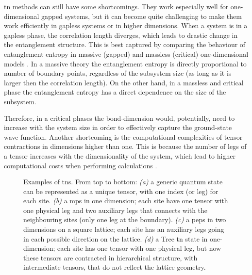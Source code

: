 \Ac{tn} methods can still have some shortcomings.
They work especially well for one-dimensional gapped systems, but it can become quite challenging to make them work efficiently in gapless systems or in higher dimensions.
When a system is in a gapless phase, the correlation length diverges, which leads to drastic change in the entanglement structure.
This is best captured by comparing the behaviour of entanglement entropy in massive (gapped) and massless (critical) one-dimensional models \cite{calabrese2004qft, calabrese2009cft}.
In a massive theory the entanglement entropy is directly proportional to number of boundary points, regardless of the subsystem size (as long as it is larger then the correlation length).
On the other hand, in a massless and critical phase the entanglement entropy has a direct dependence on the size of the subsystem.

Therefore, in a critical phases the bond-dimension would, potentially, need to increase with the system size in order to effectively capture the ground-state wave-function.
Another shortcoming is the computational complexities of tensor contractions in dimensions higher than one.
This is because the number of legs of a tensor increases with the dimensionality of the system, which lead to higher computational costs when performing calculations \cite{orus2014tensor}.


\begin{figure}[p]
    \centering
    

    \vspace*{0.5cm}

    \caption[Examples of Tensor Networks]{Examples of \acp{tn}. From top to bottom:
        \emph{(a)} a generic quantum state can be represented as a unique tensor, with one index (or leg) for each site.
        \emph{(b)} a \ac{mps} in one dimension; each site have one tensor with one physical leg and two auxiliary legs that connects with the neighbouring sites (only one leg at the boundary).
        \emph{(c)} a \ac{peps} in two dimensions on a square lattice; each site has an auxiliary legs going in each possible direction on the lattice.
        \emph{(d)} a Tree \ac{tn} state in one-dimension; each site has one tensor with one physical leg, but now these tensors are contracted in hierarchical structure, with intermediate tensors, that do not reflect the lattice geometry.
    }
    \label{fig:tensor_networks}
\end{figure}

\clearpage
